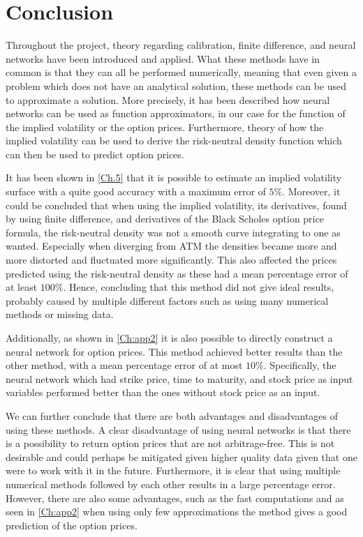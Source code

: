 \chapter{Conclusion}\label{Ch.Conclusion}



Throughout the project, theory regarding calibration, finite difference, and neural networks have been introduced and applied. What these methods have in common is that they can all be performed numerically, meaning that even given a problem which does not have an analytical solution, these methods can be used to approximate a solution. More precisely, it has been described how neural networks can be used as function approximators, in our case for the function of the implied volatility or the option prices. Furthermore, theory of how the implied volatility can be used to derive the risk-neutral density function which can then be used to predict option prices. 

It has been shown in \autoref{Ch.5} that it is possible to estimate an implied volatility surface with a quite good accuracy with a maximum error of $5\%$. Moreover, it could be concluded that when using the implied volatility, its derivatives, found by using finite difference, and derivatives of the Black Scholes option price formula, the risk-neutral density was not a smooth curve integrating to one as wanted. Especially when diverging from ATM the densities became more and more distorted and fluctuated more significantly. This also affected the prices predicted using the risk-neutral density as these had a mean percentage error of at least $100\%$. Hence, concluding that this method did not give ideal results, probably caused by multiple different factors such as using many numerical methods or missing data.

Additionally, as shown in \autoref{Ch:app2} it is also possible to directly construct a neural network for option prices. This method achieved better results than the other method, with a mean percentage error of at most $10\%$. Specifically, the neural network which had strike price, time to maturity, and stock price as input variables performed better than the ones without stock price as an input.

We can further conclude that there are both advantages and disadvantages of using these methods. A clear disadvantage of using neural networks is that there is a possibility to return option prices that are not arbitrage-free. This is not desirable and could perhaps be mitigated given higher quality data given that one were to work with it in the future. Furthermore, it is clear that using multiple numerical methods followed by each other results in a large percentage error. However, there are also some advantages, such as the fast computations and as seen in \autoref{Ch:app2} when using only few approximations the method gives a good prediction of the option prices. 


